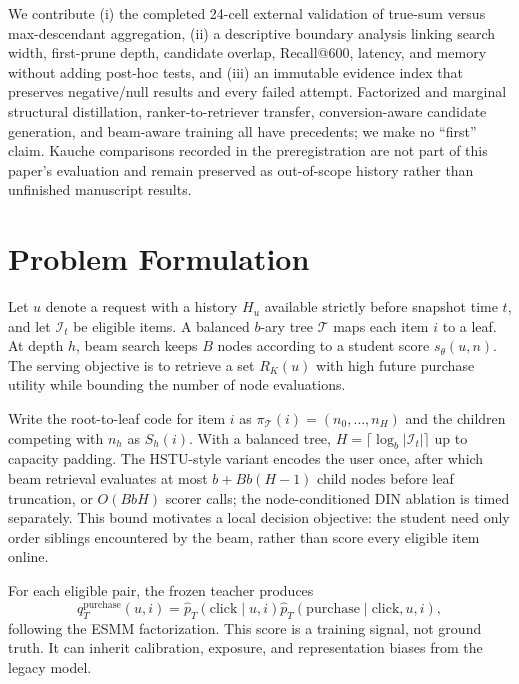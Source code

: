 \documentclass[sigconf,natbib=true]{acmart}
\begin{document}
We contribute (i) the completed 24-cell external validation of true-sum versus max-descendant aggregation, (ii) a descriptive boundary analysis linking search width, first-prune depth, candidate overlap, Recall@600, latency, and memory without adding post-hoc tests, and (iii) an immutable evidence index that preserves negative/null results and every failed attempt. Factorized and marginal structural distillation, ranker-to-retriever transfer, conversion-aware candidate generation, and beam-aware training all have precedents; we make no ``first'' claim. Kauche comparisons recorded in the preregistration are not part of this paper's evaluation and remain preserved as out-of-scope history rather than unfinished manuscript results.



\section{Problem Formulation}
Let $u$ denote a request with a history $H_u$ available strictly before snapshot time $t$, and let $\mathcal{I}_t$ be eligible items. A balanced $b$-ary tree $\mathcal{T}$ maps each item $i$ to a leaf. At depth $h$, beam search keeps $B$ nodes according to a student score $s_\theta(u,n)$. The serving objective is to retrieve a set $R_K(u)$ with high future purchase utility while bounding the number of node evaluations.

Write the root-to-leaf code for item $i$ as $\pi_{\mathcal{T}}(i)=(n_0,\ldots,n_H)$ and the children competing with $n_h$ as $S_h(i)$. With a balanced tree, $H=\lceil\log_b |\mathcal{I}_t|\rceil$ up to capacity padding. The HSTU-style variant encodes the user once, after which beam retrieval evaluates at most $b+B b(H-1)$ child nodes before leaf truncation, or $O(BbH)$ scorer calls; the node-conditioned DIN ablation is timed separately. This bound motivates a local decision objective: the student need only order siblings encountered by the beam, rather than score every eligible item online.

For each eligible pair, the frozen teacher produces
\begin{equation}
q_T^{\mathrm{purchase}}(u,i)
= \widehat{p}_{T}(\mathrm{click}\mid u,i)
  \widehat{p}_{T}(\mathrm{purchase}\mid \mathrm{click},u,i),
\label{eq:teacher}
\end{equation}
following the ESMM factorization. This score is a training signal, not ground truth. It can inherit calibration, exposure, and representation biases from the legacy model.
\end{document}
